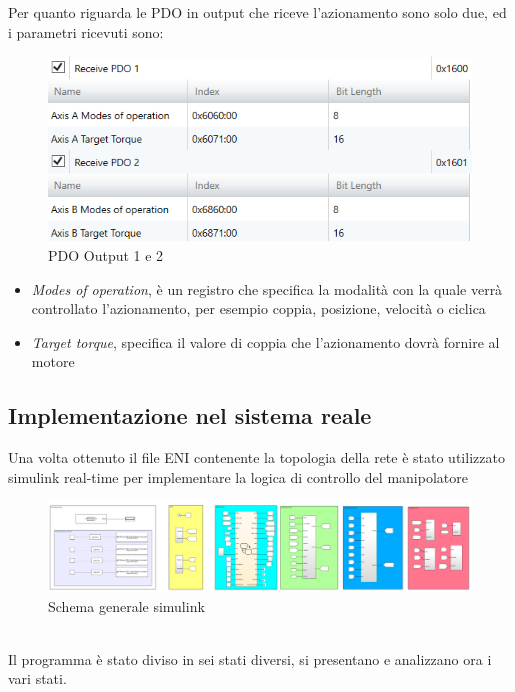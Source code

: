 Per quanto riguarda le PDO in output che riceve l'azionamento sono solo due, ed i parametri ricevuti sono:
\begin{figure}[ht]
	\begin{center}
		\includegraphics[scale=0.6]{Immagini/Sperimentale/pdo12out.png}
		\caption{PDO Output 1 e 2}
		\label{fig:PDOOut}
	\end{center}
\end{figure}
\begin{itemize}
	\item \textit{Modes of operation}, è un registro che specifica la modalità con la quale verrà controllato l'azionamento, per esempio coppia, posizione, velocità o ciclica
	\item \textit{Target torque}, specifica il valore di coppia che l'azionamento dovrà fornire al motore
\end{itemize}
\subsection{Implementazione nel sistema reale}
Una volta ottenuto il file ENI contenente la topologia della rete è stato utilizzato simulink real-time per implementare la logica di controllo del manipolatore
\begin{figure}[ht]
	\begin{center}
		\includegraphics[scale=0.5]{Immagini/Sperimentale/generalSchema}
		\caption{Schema generale simulink}
		\label{fig:SimulinkSchema}
	\end{center}
\end{figure}
\\Il programma è stato diviso in sei stati diversi, si presentano e analizzano ora i vari stati.
